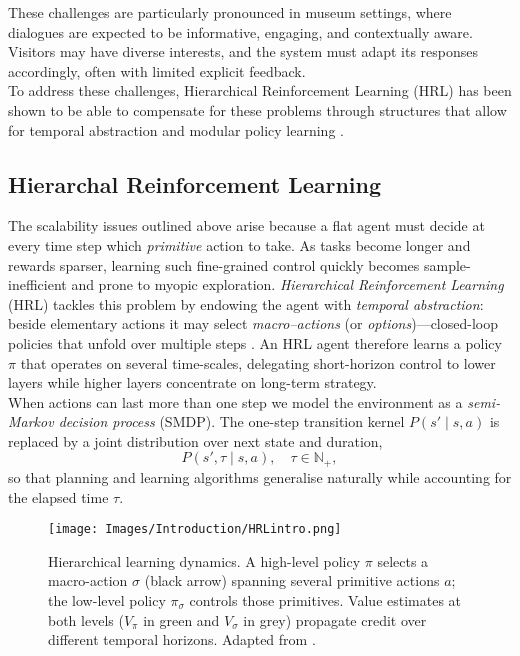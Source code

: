 \documentclass[12pt]{article}
\begin{document}
These challenges are particularly pronounced in museum settings, where dialogues are expected to be informative, engaging, and contextually aware. Visitors may have diverse interests, and the system must adapt its responses accordingly, often with limited explicit feedback.\\

To address these challenges, Hierarchical Reinforcement Learning (HRL) has been shown to be able to compensate for these problems through structures that allow for temporal abstraction and modular policy learning \cite{cuayahuitl2010evaluation}. 

\subsection{Hierarchal Reinforcement Learning}

The scalability issues outlined above arise because a flat agent must decide at
every time step which \emph{primitive} action to take.  As tasks become longer
and rewards sparser, learning such fine-grained control quickly becomes
sample-inefficient and prone to myopic exploration.  
\emph{Hierarchical Reinforcement Learning} (HRL) tackles this
problem by endowing the agent with \emph{temporal abstraction}: beside
elementary actions it may select \emph{macro–actions} (or
\textit{options})—closed-loop policies that unfold over multiple steps
\citep{dayan1993feudal,dietterich2000maxq,sutton1999between}.  
An HRL agent therefore learns a policy \(\pi\) that operates on several
time-scales, delegating short-horizon control to lower layers while higher
layers concentrate on long-term strategy.\\

When actions can last more than one step we
model the environment as a \emph{semi-Markov decision process} (SMDP).  The
one-step transition kernel \(P(s' \mid s,a)\) is replaced by a joint
distribution over next state and duration,
\[
P(s',\tau \mid s,a), \quad \tau\in\mathbb{N}_{+},
\]
so that planning and learning algorithms generalise naturally while accounting
for the elapsed time \(\tau\).

\begin{figure}[h]
    \centering
    \texttt{[image: Images/Introduction/HRLintro.png]}
    \caption{Hierarchical learning dynamics.  
    A high-level policy \(\pi\) selects a macro-action
    \(\sigma\) (black arrow) spanning several primitive
    actions \(a\); the low-level policy \(\pi_{\sigma}\) controls those
    primitives.  Value estimates at both levels (\(V_{\pi}\) in green and
    \(V_{\sigma}\) in grey) propagate credit over different temporal
    horizons.  Adapted from \citet{ribas2011neural}.}
    \label{fig:hrl_dynamics}
\end{figure}
\end{document}
